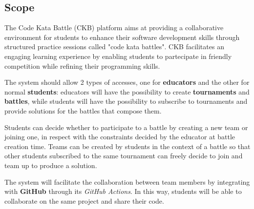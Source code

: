 \newpage
\subsection{Scope}
The Code Kata Battle (CKB) platform aims at providing a collaborative environment for students to enhance their software development skills through structured practice sessions called "code kata battles". CKB facilitates an engaging learning experience by enabling students to partecipate in friendly competition while refining their programming skills.

The system should allow 2 types of accesses, one for \textbf{educators} and the other for normal \textbf{students}: educators will have the possibility to create \textbf{tournaments} and \textbf{battles}, while students will have the possibility to subscribe to tournaments and provide solutions for the battles that compose them.

Students can decide whether to participate to a battle by creating a new team or joining one, in respect with the constraints decided by the educator at battle creation time. Teams can be created by students in the context of a battle so that other students subscribed to the same tournament can freely decide to join and team up to produce a solution.

The system will facilitate the collaboration between team members by integrating with \textbf{GitHub} through its \emph{GitHub Actions}. In this way, students will be able to collaborate on the same project and share their code.

